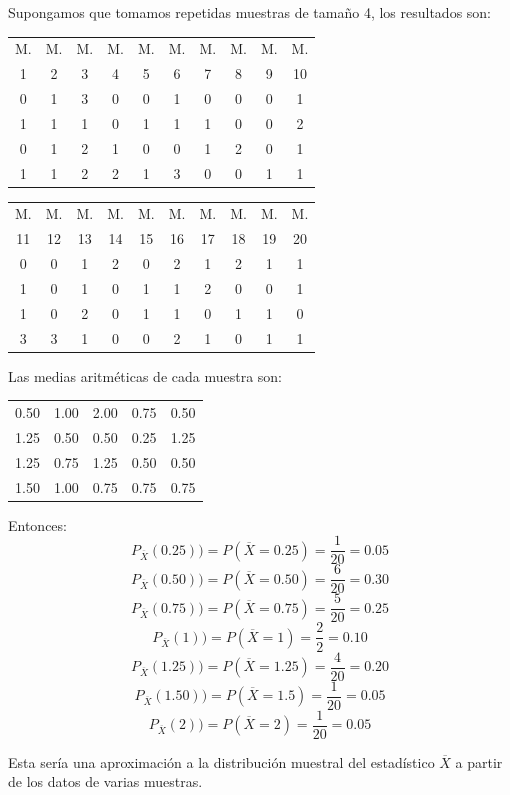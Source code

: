 \begin{frame}
   Supongamos que tomamos repetidas muestras de tamaño 4, los
     resultados son:
\begin{center}
     \begin{tabular}{c|c|c|c|c|c|c|c|c|c}
      M. & M. & M. & M. & M. & M. & M. & M. & M. & M.\\
1 & 2 & 3 & 4 & 5 & 6 & 7 & 8 & 9 & 10 \\ \hline 0&1&3&0&0&1&0&0&0&1\\
1&1&1&0&1&1&1&0&0&2\\ 0&1&2&1&0&0&1&2&0&1\\ 1&1&2&2&1&3&0&0&1&1
\end{tabular}
\end{center}

\begin{center}
     \begin{tabular}{c|c|c|c|c|c|c|c|c|c}
     M. & M. & M. & M. & M. & M. & M. & M. & M. & M.\\
11 & 12 & 13 & 14 & 15 & 16 & 17 & 18 &  19 & 20 \\
 \hline
0&0&1&2&0&2&1&2&1&1\\ 1&0&1&0&1&1&2&0&0&1\\ 1&0&2&0&1&1&0&1&1&0\\ 3&3&1&0&0&2&1&0&1&1
\end{tabular}
\end{center}

\end{frame}
\begin{frame}
Las medias aritméticas de cada muestra son:
\begin{center}
\begin{tabular}{ccccc}
 0.50&1.00&2.00&0.75&0.50\\
 1.25&0.50&0.50&0.25&1.25\\
 1.25&0.75&1.25&0.50&0.50\\
 1.50&1.00&0.75&0.75&0.75
  \end{tabular}
  \end{center}
\end{frame}

\begin{frame}
  Entonces:
  $$P_{\overline{X}}(0.25))=P(\overline{X}=0.25)=\frac{1}{20}=0.05$$
  $$P_{\overline{X}}(0.50))=P(\overline{X}=0.50)=\frac{6}{20}=0.30$$
  $$P_{\overline{X}}(0.75))=P(\overline{X}=0.75)=\frac{5}{20}=0.25$$
  $$P_{\overline{X}}(1))=P(\overline{X}=1)=\frac{2}{2}=0.10$$
  $$P_{\overline{X}}(1.25))=P(\overline{X}=1.25)=\frac{4}{20}=0.20$$
  $$P_{\overline{X}}(1.50))=P(\overline{X}=1.5)=\frac{1}{20}=0.05$$
  $$P_{\overline{X}}(2))=P(\overline{X}=2)=\frac{1}{20}=0.05$$

   Esta sería una aproximación a la distribución muestral del
   estadístico $\overline{X}$ a partir de los datos de varias
   muestras.

\end{frame}

